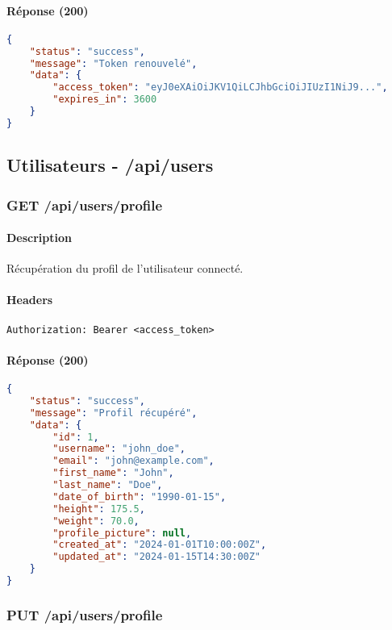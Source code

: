 \paragraph{Réponse (200)}
\begin{lstlisting}[language=json]
{
    "status": "success",
    "message": "Token renouvelé",
    "data": {
        "access_token": "eyJ0eXAiOiJKV1QiLCJhbGciOiJIUzI1NiJ9...",
        "expires_in": 3600
    }
}
\end{lstlisting}

\subsection{Utilisateurs - /api/users}

\subsubsection{GET /api/users/profile}

\paragraph{Description}
Récupération du profil de l'utilisateur connecté.

\paragraph{Headers}
\begin{lstlisting}[language=http]
Authorization: Bearer <access_token>
\end{lstlisting}

\paragraph{Réponse (200)}
\begin{lstlisting}[language=json]
{
    "status": "success",
    "message": "Profil récupéré",
    "data": {
        "id": 1,
        "username": "john_doe",
        "email": "john@example.com",
        "first_name": "John",
        "last_name": "Doe",
        "date_of_birth": "1990-01-15",
        "height": 175.5,
        "weight": 70.0,
        "profile_picture": null,
        "created_at": "2024-01-01T10:00:00Z",
        "updated_at": "2024-01-15T14:30:00Z"
    }
}
\end{lstlisting}

\subsubsection{PUT /api/users/profile}

